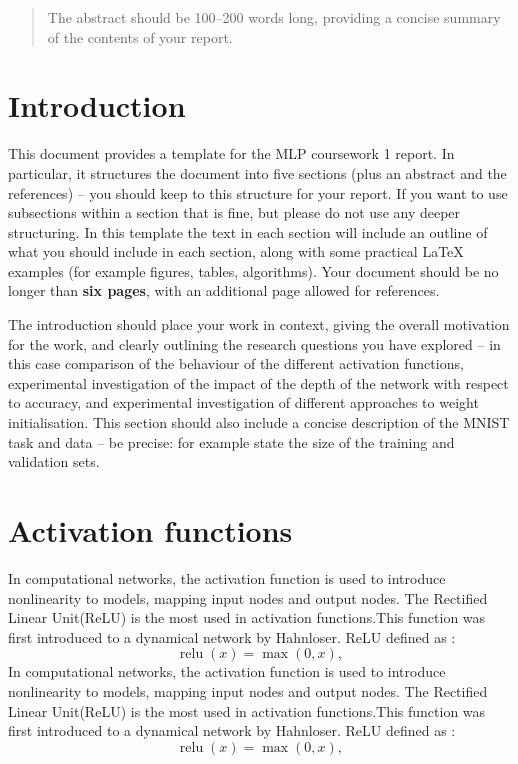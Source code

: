 \documentclass{article}
\DeclareMathOperator{\relu}{relu}
\def\studentNumber{s1771650}
\begin{document}
 

\twocolumn[
\mlptitle{MLP Coursework 1: Activation Functions}

\centerline{\studentNumber}

\vskip 7mm
]

\begin{abstract} 
The abstract should be 100--200 words long,  providing a concise summary of the contents of your report.
\end{abstract} 

\section{Introduction}
\label{sec:intro}
This document provides a template for the MLP coursework 1 report.  In particular, it structures the document into five sections  (plus an abstract and the references) -- you should keep to this structure for your report.  If you want to use subsections within a section that is fine, but please do not use any deeper structuring.  In this template the text in each section will include an outline of what you should include in each section, along with some practical LaTeX examples (for example figures, tables, algorithms).  Your document should be no longer than \textbf{six pages},  with an additional page allowed for references.

The introduction should place your work in context, giving the overall motivation for the work, and clearly outlining the research questions you have explored -- in this case comparison of the behaviour of the different activation functions,  experimental investigation of the impact of the depth of the network with respect to accuracy, and experimental investigation of different approaches to weight initialisation.  This section should also include a concise description of the MNIST task and  data -- be precise: for example state the size of the training and validation sets.

\section{Activation functions}
\label{sec:actfn}
In computational networks, the activation function is used to introduce nonlinearity to models, mapping input nodes and output nodes. The Rectified Linear Unit(ReLU) is the most used in activation functions.This function was first introduced to a dynamical network by Hahnloser. ReLU defined as :
\begin{equation}
  \relu(x) = \max(0, x) ,
\end{equation} 
In computational networks, the activation function is used to introduce nonlinearity to models, mapping input nodes and output nodes. The Rectified Linear Unit(ReLU) is the most used in activation functions.This function was first introduced to a dynamical network by Hahnloser. ReLU defined as :
\begin{equation}
  \relu(x) = \max(0, x) ,
\end{equation} 
\end{document}
